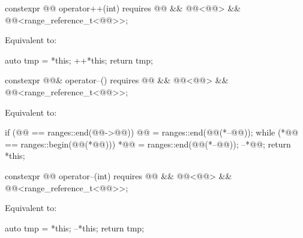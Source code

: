 %
\begin{itemdecl}
constexpr @@ operator++(int)
  requires @@ && @@<@@> &&
           @@<range_reference_t<@@>>;
\end{itemdecl}

\begin{itemdescr}
\pnum
\effects
Equivalent to:
\begin{codeblock}
auto tmp = *this;
++*this;
return tmp;
\end{codeblock}
\end{itemdescr}

%
\begin{itemdecl}
constexpr @@& operator--()
  requires @@ && @@<@@> &&
           @@<range_reference_t<@@>>;
\end{itemdecl}

\begin{itemdescr}
\pnum
\effects
Equivalent to:
\begin{codeblock}
if (@@ == ranges::end(@@->@@))
  @@ = ranges::end(@@(*--@@));
while (*@@ == ranges::begin(@@(*@@)))
  *@@ = ranges::end(@@(*--@@));
--*@@;
return *this;
\end{codeblock}
\end{itemdescr}

%
\begin{itemdecl}
constexpr @@ operator--(int)
  requires @@ && @@<@@> &&
           @@<range_reference_t<@@>>;
\end{itemdecl}

\begin{itemdescr}
\pnum
\effects
Equivalent to:
\begin{codeblock}
auto tmp = *this;
--*this;
return tmp;
\end{codeblock}
\end{itemdescr}

